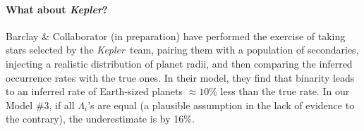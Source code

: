 \paragraph{What about {\it Kepler}?}
Barclay \& Collaborator (in preparation) have performed the exercise 
of taking stars selected by the {\it Kepler}\ team, pairing them with a 
population of secondaries, injecting a realistic distribution of planet radii, 
and then comparing the inferred occurrence rates with the true ones.
In their model, they find that binarity leads to an inferred rate of 
Earth-sized planets $\approx 10\%$ less than the true rate.
In our Model \#3, if all $\Lambda_i$'s are equal (a plausible assumption in 
the lack of evidence to the contrary), the underestimate is by 16\%.
